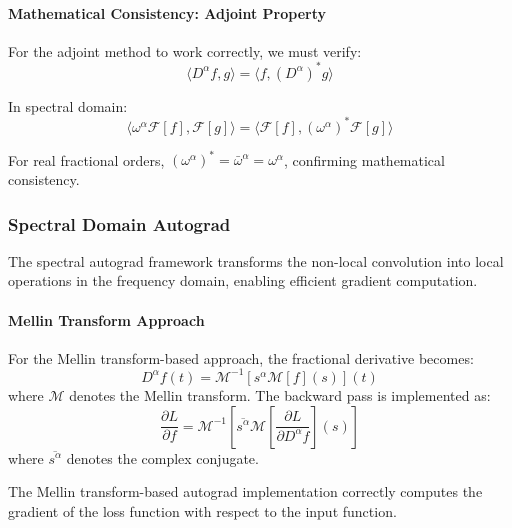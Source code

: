 \paragraph{Mathematical Consistency: Adjoint Property}

For the adjoint method to work correctly, we must verify:
\begin{equation}
\langle D^{\alpha} f, g \rangle = \langle f, (D^{\alpha})^* g \rangle
\end{equation}

In spectral domain:
\begin{equation}
\langle \omega^{\alpha} \mathcal{F}[f], \mathcal{F}[g] \rangle = \langle \mathcal{F}[f], (\omega^{\alpha})^* \mathcal{F}[g] \rangle
\end{equation}

For real fractional orders, $(\omega^{\alpha})^* = \bar{\omega}^{\alpha} = \omega^{\alpha}$, confirming mathematical consistency.

\subsubsection{Spectral Domain Autograd}

The spectral autograd framework transforms the non-local convolution into local operations in the frequency domain, enabling efficient gradient computation.

\paragraph{Mellin Transform Approach}

For the Mellin transform-based approach, the fractional derivative becomes:
\begin{equation}
D^{\alpha} f(t) = \mathcal{M}^{-1}[s^{\alpha} \mathcal{M}[f](s)](t)
\end{equation}
where $\mathcal{M}$ denotes the Mellin transform. The backward pass is implemented as:
\begin{equation}
\frac{\partial L}{\partial f} = \mathcal{M}^{-1}\left[\overline{s^{\alpha}} \mathcal{M}\left[\frac{\partial L}{\partial D^{\alpha}f}\right](s)\right]
\end{equation}
where $\overline{s^{\alpha}}$ denotes the complex conjugate.

\begin{theorem}
The Mellin transform-based autograd implementation correctly computes the gradient of the loss function with respect to the input function.
\end{theorem}

